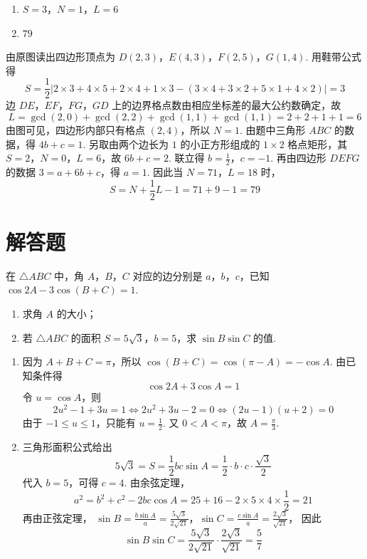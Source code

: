 \begin{answer}
\begin{enumerate}
\item \(S=3\)，\(N=1\)，\(L=6\)
\item \(79\)
\end{enumerate}
\end{answer}

\begin{solution}
由原图读出四边形顶点为 \(D(2,3)\)，\(E(4,3)\)，\(F(2,5)\)，\(G(1,4)\). 用鞋带公式得
\[
 S=\frac12\left|2\times3+4\times5+2\times4+1\times3
 -(3\times4+3\times2+5\times1+4\times2)\right|=3
\]
边 \(DE\)，\(EF\)，\(FG\)，\(GD\) 上的边界格点数由相应坐标差的最大公约数确定，故
\[
 L=\gcd(2,0)+\gcd(2,2)+\gcd(1,1)+\gcd(1,1)=2+2+1+1=6
\]
由图可见，四边形内部只有格点 \((2,4)\)，所以 \(N=1\).
由题中三角形 \(ABC\) 的数据，得 \(4b+c=1\). 另取由两个边长为 \(1\) 的小正方形组成的 \(1\times2\) 格点矩形，其 \(S=2\)，\(N=0\)，\(L=6\)，故 \(6b+c=2\). 联立得
\(b=\frac12\)，\(c=-1\).
再由四边形 \(DEFG\) 的数据 \(3=a+6b+c\)，得 \(a=1\). 因此当 \(N=71\)，\(L=18\) 时，
\[
 S=N+\frac12L-1=71+9-1=79
\]
\end{solution}

\section{解答题}

\begin{problem}
在 \(\triangle ABC\) 中，角 \(A\)，\(B\)，\(C\) 对应的边分别是 \(a\)，\(b\)，\(c\)，已知 \(\cos 2A-3\cos(B+C)=1\).

\begin{enumerate}
\item 求角 \(A\) 的大小；
\item 若 \(\triangle ABC\) 的面积 \(S=5\sqrt{3}\)，\(b=5\)，求 \(\sin B\sin C\) 的值.
\end{enumerate}
\end{problem}

\begin{solution}
\begin{enumerate}
\item 因为 \(A+B+C=\pi\)，所以 \(\cos(B+C)=\cos(\pi-A)=-\cos A\). 由已知条件得
\[
 \cos2A+3\cos A=1
\]
令 \(u=\cos A\)，则
\[
 2u^2-1+3u=1\iff 2u^2+3u-2=0
 \iff (2u-1)(u+2)=0
\]
由于 \(-1\leqslant u\leqslant1\)，只能有 \(u=\frac12\). 又 \(0<A<\pi\)，故 \(A=\frac\pi3\).

\item 三角形面积公式给出
\[
 5\sqrt3=S=\frac12bc\sin A=\frac12\cdot b\cdot c\cdot\frac{\sqrt3}{2}
\]
代入 \(b=5\)，可得 \(c=4\). 由余弦定理，
\[
 a^2=b^2+c^2-2bc\cos A=25+16-2\times5\times4\times\frac12=21
\]
再由正弦定理，
\(\sin B=\frac{b\sin A}{a}=\frac{5\sqrt3}{2\sqrt{21}}\)，\(\sin C=\frac{c\sin A}{a}=\frac{2\sqrt3}{\sqrt{21}}\)，
因此
\[
 \sin B\sin C=\frac{5\sqrt3}{2\sqrt{21}}\cdot\frac{2\sqrt3}{\sqrt{21}}=\frac57
\]
\end{enumerate}
\end{solution}

